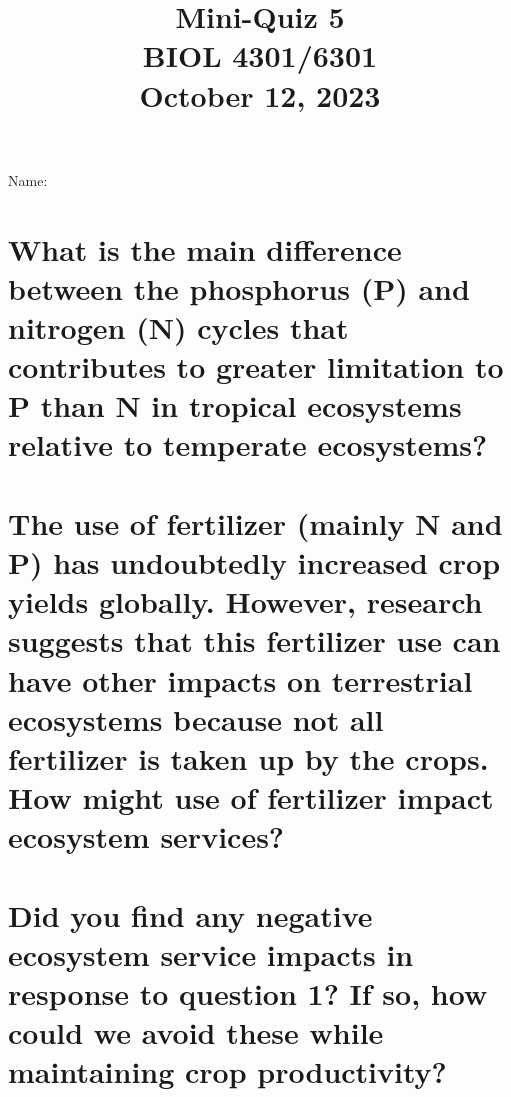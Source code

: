 \documentclass[12pt, notitlepage]{article}   	%
\title{
	\textbf{
		Mini-Quiz 5
	} \\
	\large BIOL 4301/6301 \\
	\large October 12, 2023 \\
}
\date{\vspace{-5ex}}
\def\wl{\par \vspace{\baselineskip}}
\begin{document}
{\selectfont %

\large{Name:}

{\let\newpage\relax\maketitle}

\section{\small{What is the main difference between the phosphorus (P) and nitrogen (N)
cycles that contributes to greater limitation to P than N in tropical ecosystems relative
to temperate ecosystems?}}

\newpage

\section{\small{The use of fertilizer (mainly N and P) has undoubtedly increased
crop yields globally. However, research suggests that this fertilizer use can have other
impacts on terrestrial ecosystems because not all fertilizer is taken up by the crops.
How might use of fertilizer impact ecosystem services?}}

\wl
\wl
\wl
\wl
\wl
\wl
\wl
\wl
\wl
\wl
\wl
\wl
\wl

\section{\small{Did you find any negative ecosystem service impacts in response to question 1?
If so, how could we avoid these while maintaining crop productivity?}}


} %
\end{document}
